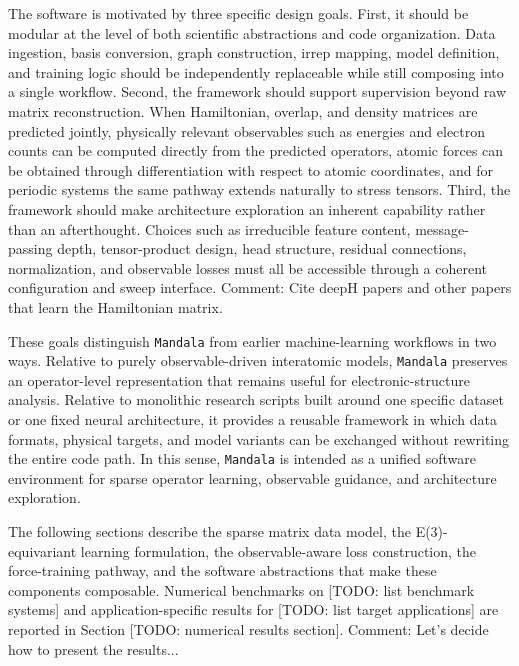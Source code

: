 The software is motivated by three specific design goals. First, it should be modular at the level of both scientific abstractions and code organization. Data ingestion, basis conversion, graph construction, irrep mapping, model definition, and training logic should be independently replaceable while still composing into a single workflow. Second, the framework should support supervision beyond raw matrix reconstruction. When Hamiltonian, overlap, and density matrices are predicted jointly, physically relevant observables such as energies and electron counts can be computed directly from the predicted operators, atomic forces can be obtained through differentiation with respect to atomic coordinates, and for periodic systems the same pathway extends naturally to stress tensors. Third, the framework should make architecture exploration an inherent capability rather than an afterthought. Choices such as irreducible feature content, message-passing depth, tensor-product design, head structure, residual connections, normalization, and observable losses must all be accessible through a coherent configuration and sweep interface.
Comment: Cite deepH papers and other papers that learn the Hamiltonian matrix.

These goals distinguish \texttt{Mandala} from earlier machine-learning workflows in two ways. Relative to purely observable-driven interatomic models, \texttt{Mandala} preserves an operator-level representation that remains useful for electronic-structure analysis. Relative to monolithic research scripts built around one specific dataset or one fixed neural architecture, it provides a reusable framework in which data formats, physical targets, and model variants can be exchanged without rewriting the entire code path. In this sense, \texttt{Mandala} is intended as a unified software environment for sparse operator learning, observable guidance, and architecture exploration.

The following sections describe the sparse matrix data model, the E(3)-equivariant learning formulation, the observable-aware loss construction, the force-training pathway, and the software abstractions that make these components composable. Numerical benchmarks on [TODO: list benchmark systems] and application-specific results for [TODO: list target applications] are reported in Section [TODO: numerical results section].
Comment: Let's decide how to present the results...

